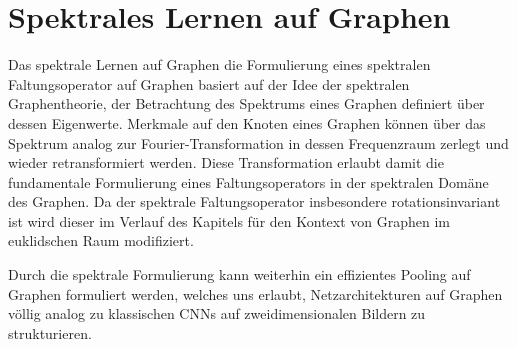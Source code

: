 \chapter{Spektrales Lernen auf Graphen}
\label{spektrales_lernen}

Das spektrale Lernen auf Graphen \bzw{} die Formulierung eines spektralen Faltungsoperator auf Graphen basiert auf der Idee der spektralen Graphentheorie, \dhe{} der Betrachtung des Spektrums eines Graphen definiert über dessen Eigenwerte.
Merkmale auf den Knoten eines Graphen können über das Spektrum analog zur Fourier-Transformation in dessen Frequenzraum zerlegt und wieder retransformiert werden.
Diese Transformation erlaubt damit die fundamentale Formulierung eines Faltungsoperators in der spektralen Domäne des Graphen.
Da der spektrale Faltungsoperator insbesondere rotationsinvariant ist wird dieser im Verlauf des Kapitels für den Kontext von Graphen im euklidschen Raum modifiziert.

Durch die spektrale Formulierung kann weiterhin ein effizientes Pooling auf Graphen formuliert werden, welches uns erlaubt, Netzarchitekturen auf Graphen völlig analog zu klassischen \glspl{CNN} auf zweidimensionalen Bildern zu strukturieren.







